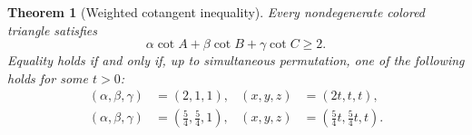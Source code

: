 \documentclass[11pt,a4paper]{article}
\newtheorem{theorem}{Theorem}[section]
\theoremstyle{definition}
\theoremstyle{remark}
\begin{document}
\begin{theorem}[Weighted cotangent inequality]
\label{thm:triangle}
Every nondegenerate colored triangle satisfies
\begin{equation}
\label{eq:triangle-inequality}
\alpha\cot A+\beta\cot B+\gamma\cot C\geq2.
\end{equation}
Equality holds if and only if, up to simultaneous permutation, one of the
following holds for some $t>0$:
\begin{align}
\label{eq:equality-right}
(\alpha,\beta,\gamma)&=(2,1,1),&
(x,y,z)&=(2t,t,t),\\
\label{eq:equality-isosceles}
(\alpha,\beta,\gamma)&=(\tfrac54,\tfrac54,1),&
(x,y,z)&=(\tfrac54t,\tfrac54t,t).
\end{align}
\end{theorem}
\end{document}
